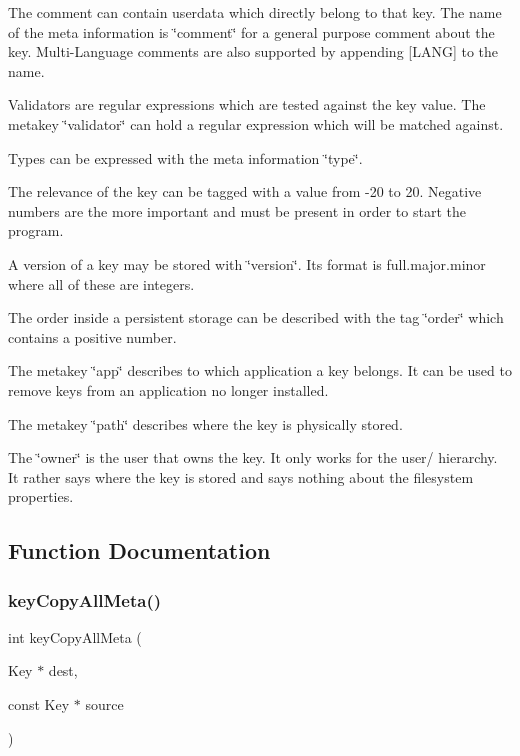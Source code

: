 The comment can contain userdata which directly belong to that key. The name of the meta information is \char`\"{}comment\char`\"{} for a general purpose comment about the key. Multi-\/\+Language comments are also supported by appending \mbox{[}L\+A\+NG\mbox{]} to the name.

Validators are regular expressions which are tested against the key value. The metakey \char`\"{}validator\char`\"{} can hold a regular expression which will be matched against.

Types can be expressed with the meta information \char`\"{}type\char`\"{}.

The relevance of the key can be tagged with a value from -\/20 to 20. Negative numbers are the more important and must be present in order to start the program.

A version of a key may be stored with \char`\"{}version\char`\"{}. Its format is full.\+major.\+minor where all of these are integers.

The order inside a persistent storage can be described with the tag \char`\"{}order\char`\"{} which contains a positive number.

The metakey \char`\"{}app\char`\"{} describes to which application a key belongs. It can be used to remove keys from an application no longer installed.

The metakey \char`\"{}path\char`\"{} describes where the key is physically stored.

The \char`\"{}owner\char`\"{} is the user that owns the key. It only works for the user/ hierarchy. It rather says where the key is stored and says nothing about the filesystem properties. 

\subsection{Function Documentation}
\mbox{\label{group__keymeta_ga8e63720a65610a29597494d0671f9401}} 
\subsubsection{\texorpdfstring{keyCopyAllMeta()}{keyCopyAllMeta()}}
{\footnotesize\ttfamily int key\+Copy\+All\+Meta (\begin{DoxyParamCaption}\item[{Key $\ast$}]{dest,  }\item[{const Key $\ast$}]{source }\end{DoxyParamCaption})}



